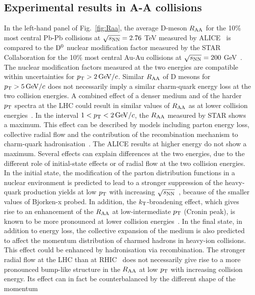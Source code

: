 \subsection{Experimental results in A-A collisions}
\label{sec:resAAcap2}
In the left-hand panel of Fig.~\ref{fig:Raa}, the average D-meson $R_{\rm AA}$ 
for the 10\% most central Pb-Pb collisions at $\sqrt{s_{\rm NN}} = 2.76$ TeV 
measured by ALICE~\cite{Adam:2015sza} is compared to the ${\rm D^0}$ 
nuclear modification factor measured by the STAR Collaboration
for the 10\% most central Au-Au collisions at $\sqrt{s_{\rm NN}} = 200$ GeV~\cite{Adamczyk:2014uip}. 
The nuclear modification factors measured at the two energies are compatible within uncertainties for $p_{\rm T} > 2\, \mathrm{GeV}/c$.
Similar $R_{\rm AA}$ of D mesons for $p_{\rm T} > 5 \,\mathrm{GeV}/c$ does not necessarily imply a similar charm-quark
energy loss at the two collision energies. A combined effect of a denser medium
and of the harder $p_{\rm T}$ spectra at the LHC could result in similar values of $R_{\rm AA}$ as at lower
collision energies~\cite{Baier:2002tc}. In the interval $1 < p_{\rm T} < 2\, \mathrm{GeV}/c$, the $R_{\rm AA}$ 
measured by STAR shows a maximum. This effect can be described 
by models including parton energy loss, collective
radial flow and the contribution of the recombination mechanism to 
charm-quark hadronisation~\cite{Abelev:2006db}. The ALICE results at higher energy 
do not show a maximum. Several effects can explain differences at the two energies, 
due to the different role of initial-state effects or of radial flow at the 
two collision energies. In the initial state, the modification
of the parton distribution functions in a nuclear environment is predicted to lead
to a stronger suppression of the heavy-quark production yields at low $p_{\rm T}$ with increasing
$\sqrt{s_{\rm NN}}$~\cite{Eskola:2009uj}, because of the smaller values of Bjorken-x probed. In addition, the 
$k_{\rm T}$-broadening effect, which gives rise to an enhancement of the $R_{\rm AA}$ at low-intermediate
$p_{\rm T}$ (Cronin peak), is known to be more pronounced at lower collision energies~\cite{Wang:1998ww,Vogt:2001nh}.
In the final state, in addition to energy loss, the collective expansion of the medium is
also predicted to affect the momentum distribution of charmed hadrons in heavy-ion collisions.
This effect could be enhanced by hadronisation via recombination.
The stronger radial flow at the LHC than at RHIC~\cite{Abelev:2008ab,Abelev:2013vea,Abelev:2012wca} does not necessarily give rise
to a more pronounced bump-like structure in the $R_{\rm AA}$ at low $p_{\rm T}$ with increasing collision
energy. Its effect can in fact be counterbalanced by the different shape of the momentum
